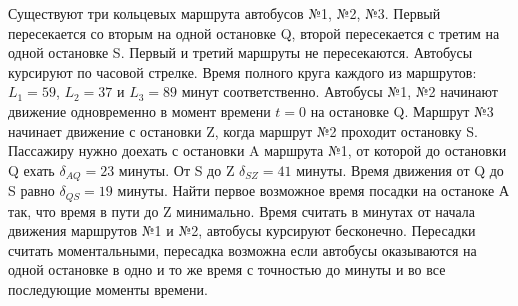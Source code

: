 
Существуют три кольцевых маршрута автобусов №1, №2, №3. Первый пересекается со вторым на одной остановке Q, 
второй пересекается с третим на одной остановке S. Первый и третий маршруты не пересекаются. Автобусы курсируют 
по часовой стрелке. Время полного круга каждого из маршрутов: $L_1 = 59$, $L_2 = 37$ и $L_3 = 89$ минут 
соответственно. Автобусы №1, №2 начинают движение одновременно в момент времени $t=0$ на остановке Q.  
Маршрут №3 начинает движение с остановки Z, когда маршрут №2 проходит остановку S.
Пассажиру нужно доехать с остановки A маршрута №1, от которой до остановки Q ехать $\delta_{AQ} = 23$ 
минуты. От S до Z $\delta_{SZ} = 41$ минуты. Время движения от Q до S равно $\delta_{QS} = 19$ минуты. 
Найти первое возможное время посадки на останоке А так, что время в пути до Z минимально. Время считать 
в минутах от начала движения маршрутов №1 и №2, автобусы курсируют бесконечно. Пересадки считать 
моментальными, пересадка возможна если автобусы оказываются на одной остановке в одно и то же время с 
точностью до минуты и во все последующие моменты времени.